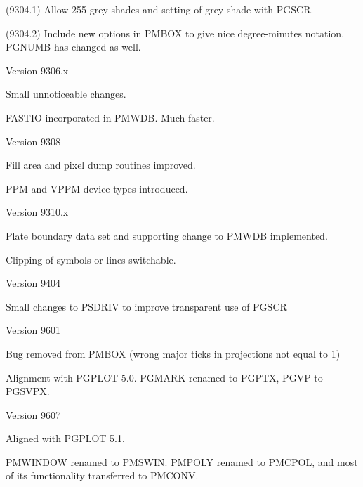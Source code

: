 \documentclass[titlepage,a4paper]{article}
\begin{document}
\begin{leftitemize}
\begin{leftitemize}
\item (9304.1) Allow 255 grey shades and setting of grey shade with PGSCR.
\item (9304.2) Include new options in PMBOX to give nice degree-minutes
  notation. PGNUMB has changed as well.
\end{leftitemize}
\item Version 9306.x
\begin{leftitemize}
\item Small unnoticeable changes.
\item FASTIO incorporated in PMWDB. Much faster.
\end{leftitemize}
\item Version 9308
\begin{leftitemize}
\item Fill area and pixel dump routines improved.
\item PPM and VPPM device types introduced.
\end{leftitemize}
\item Version 9310.x
\begin{leftitemize}
\item Plate boundary data set and supporting change to PMWDB implemented.
\item Clipping of symbols or lines switchable.
\end{leftitemize}
\item Version 9404
\begin{leftitemize}
\item Small changes to PSDRIV to improve transparent use of PGSCR
\end{leftitemize}
\item Version 9601
\begin{leftitemize}
\item Bug removed from PMBOX (wrong major ticks in projections not equal to
1)
\item Alignment with PGPLOT 5.0. PGMARK renamed to PGPTX, PGVP to PGSVPX.
\end{leftitemize}
\item Version 9607
\begin{leftitemize}
\item Aligned with PGPLOT 5.1.
\item PMWINDOW renamed to PMSWIN. PMPOLY renamed to PMCPOL, and most of
its functionality transferred to PMCONV.
\end{leftitemize}
\end{leftitemize}
\end{document}

